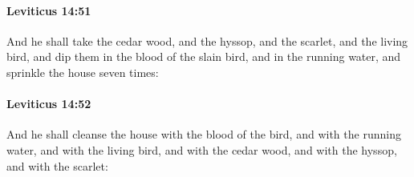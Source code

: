 		\paragraph{Leviticus 14:51} %
			\label{LEVITICUS-14-51}

			And he shall take the cedar wood, and the hyssop, and the scarlet, and the living bird, and dip them in the blood of the slain bird, and in the running water, and sprinkle the house seven times:


		\paragraph{Leviticus 14:52} %
			\label{LEVITICUS-14-52}

			And he shall cleanse the house with the blood of the bird, and with the running water, and with the living bird, and with the cedar wood, and with the hyssop, and with the scarlet:

